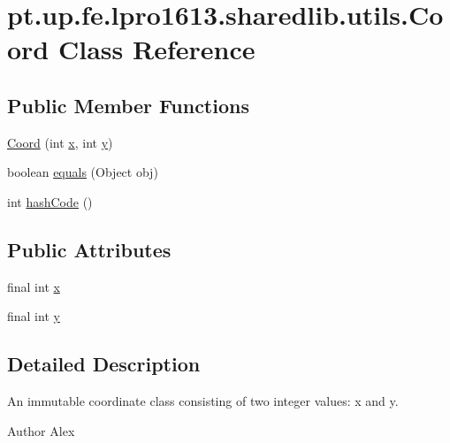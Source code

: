 \hypertarget{classpt_1_1up_1_1fe_1_1lpro1613_1_1sharedlib_1_1utils_1_1_coord}{}\section{pt.\+up.\+fe.\+lpro1613.\+sharedlib.\+utils.\+Coord Class Reference}
\label{classpt_1_1up_1_1fe_1_1lpro1613_1_1sharedlib_1_1utils_1_1_coord}
\subsection*{Public Member Functions}
\begin{DoxyCompactItemize}
\item 
\hyperlink{classpt_1_1up_1_1fe_1_1lpro1613_1_1sharedlib_1_1utils_1_1_coord_a43ebef088b4a7b390ac60f7fb4a200bb}{Coord} (int \hyperlink{classpt_1_1up_1_1fe_1_1lpro1613_1_1sharedlib_1_1utils_1_1_coord_af2171634c65acdea92a4b9794069058b}{x}, int \hyperlink{classpt_1_1up_1_1fe_1_1lpro1613_1_1sharedlib_1_1utils_1_1_coord_a8ebd9de4e95352eb228ecbd1fe916259}{y})
\item 
boolean \hyperlink{classpt_1_1up_1_1fe_1_1lpro1613_1_1sharedlib_1_1utils_1_1_coord_ab7b6eb36dbf1fe7df81fb9cfedeed2eb}{equals} (Object obj)
\item 
int \hyperlink{classpt_1_1up_1_1fe_1_1lpro1613_1_1sharedlib_1_1utils_1_1_coord_aba6a1e22404fa05826536d96a00bd5c4}{hash\+Code} ()
\end{DoxyCompactItemize}
\subsection*{Public Attributes}
\begin{DoxyCompactItemize}
\item 
final int \hyperlink{classpt_1_1up_1_1fe_1_1lpro1613_1_1sharedlib_1_1utils_1_1_coord_af2171634c65acdea92a4b9794069058b}{x}
\item 
final int \hyperlink{classpt_1_1up_1_1fe_1_1lpro1613_1_1sharedlib_1_1utils_1_1_coord_a8ebd9de4e95352eb228ecbd1fe916259}{y}
\end{DoxyCompactItemize}


\subsection{Detailed Description}
An immutable coordinate class consisting of two integer values\+: x and y. \begin{DoxyAuthor}{Author}
Alex 
\end{DoxyAuthor}


